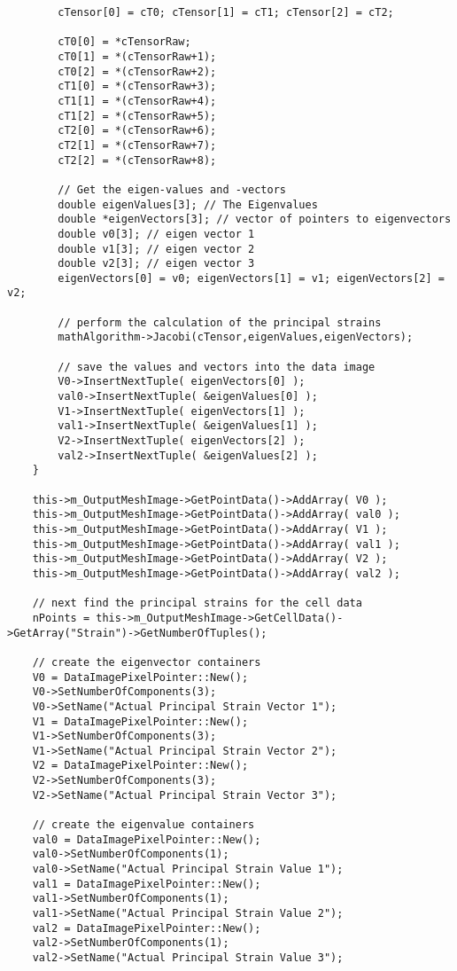 \begin{lstlisting}
		cTensor[0] = cT0; cTensor[1] = cT1; cTensor[2] = cT2;

		cT0[0] = *cTensorRaw;
		cT0[1] = *(cTensorRaw+1);
		cT0[2] = *(cTensorRaw+2);	
		cT1[0] = *(cTensorRaw+3);
		cT1[1] = *(cTensorRaw+4);
		cT1[2] = *(cTensorRaw+5);
		cT2[0] = *(cTensorRaw+6);
		cT2[1] = *(cTensorRaw+7);
		cT2[2] = *(cTensorRaw+8);
				
		// Get the eigen-values and -vectors
		double eigenValues[3]; // The Eigenvalues
		double *eigenVectors[3]; // vector of pointers to eigenvectors
		double v0[3]; // eigen vector 1
		double v1[3]; // eigen vector 2
		double v2[3]; // eigen vector 3
		eigenVectors[0] = v0; eigenVectors[1] = v1; eigenVectors[2] = v2;
		
		// perform the calculation of the principal strains
		mathAlgorithm->Jacobi(cTensor,eigenValues,eigenVectors);
		
		// save the values and vectors into the data image
		V0->InsertNextTuple( eigenVectors[0] );
		val0->InsertNextTuple( &eigenValues[0] );
		V1->InsertNextTuple( eigenVectors[1] );
		val1->InsertNextTuple( &eigenValues[1] );
		V2->InsertNextTuple( eigenVectors[2] );
		val2->InsertNextTuple( &eigenValues[2] );
	}
	
	this->m_OutputMeshImage->GetPointData()->AddArray( V0 );
	this->m_OutputMeshImage->GetPointData()->AddArray( val0 );
	this->m_OutputMeshImage->GetPointData()->AddArray( V1 );
	this->m_OutputMeshImage->GetPointData()->AddArray( val1 );
	this->m_OutputMeshImage->GetPointData()->AddArray( V2 );
	this->m_OutputMeshImage->GetPointData()->AddArray( val2 );
	
	// next find the principal strains for the cell data
	nPoints = this->m_OutputMeshImage->GetCellData()->GetArray("Strain")->GetNumberOfTuples();
	
	// create the eigenvector containers
	V0 = DataImagePixelPointer::New();
	V0->SetNumberOfComponents(3);
	V0->SetName("Actual Principal Strain Vector 1");
	V1 = DataImagePixelPointer::New();
	V1->SetNumberOfComponents(3);
	V1->SetName("Actual Principal Strain Vector 2");	
	V2 = DataImagePixelPointer::New();
	V2->SetNumberOfComponents(3);
	V2->SetName("Actual Principal Strain Vector 3");

	// create the eigenvalue containers
	val0 = DataImagePixelPointer::New();
	val0->SetNumberOfComponents(1);
	val0->SetName("Actual Principal Strain Value 1");
	val1 = DataImagePixelPointer::New();
	val1->SetNumberOfComponents(1);
	val1->SetName("Actual Principal Strain Value 2");
	val2 = DataImagePixelPointer::New();
	val2->SetNumberOfComponents(1);
	val2->SetName("Actual Principal Strain Value 3");
	

\end{lstlisting}

